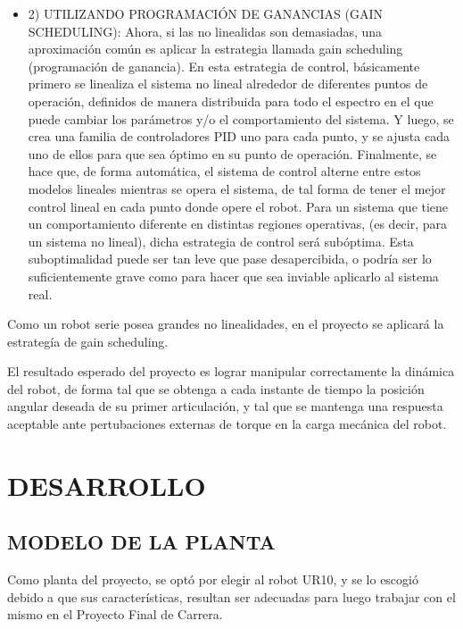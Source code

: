 \documentclass{article}
\begin{document}
\begin{sloppypar}
\begin{itemize}
    \item 2) UTILIZANDO PROGRAMACIÓN DE GANANCIAS (GAIN SCHEDULING): Ahora, si las no linealidas son demasiadas, una aproximación común es aplicar la estrategia llamada gain scheduling (programación de ganancia). En esta estrategia de control, básicamente primero se linealiza el sistema no lineal alrededor de diferentes puntos de operación, definidos de manera distribuida para todo el espectro en el que puede cambiar los parámetros y/o el comportamiento del sistema. Y luego, se crea una familia de controladores PID uno para cada punto, y se ajusta cada uno de ellos para que sea óptimo en su punto de operación. Finalmente, se hace que, de forma automática, el sistema de control alterne entre estos modelos lineales mientras se opera el sistema, de tal forma de tener el mejor control lineal en cada punto donde opere el robot.
    Para un sistema que tiene un comportamiento diferente en distintas regiones operativas, (es decir, para un sistema no lineal), dicha estrategia de control será subóptima. Esta suboptimalidad puede ser tan leve que pase desapercibida, o podría ser lo suficientemente grave como para hacer que sea inviable aplicarlo al sistema real.
\end{itemize}

Como un robot serie posea grandes no linealidades, en el proyecto se aplicará la estrategía de gain scheduling.

El resultado esperado del proyecto es lograr manipular correctamente la dinámica del robot, de forma tal que se obtenga a cada instante de tiempo la posición angular deseada de su primer articulación, y tal que se mantenga una respuesta aceptable ante pertubaciones externas de torque en la carga mecánica del robot.



\section{DESARROLLO}
\label{sec:DESARROLLO}

\subsection{MODELO DE LA PLANTA}
\label{sec:MODELO DE LA PLANTA}

Como planta del proyecto, se optó por elegir al robot UR10, y se lo escogió debido a que sus características, resultan ser adecuadas para luego trabajar con el mismo en el Proyecto Final de Carrera.


\end{sloppypar}
\end{document}
